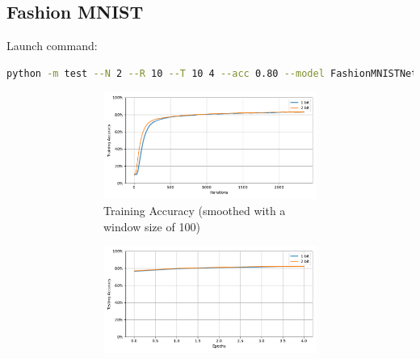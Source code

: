     \subsection{Fashion MNIST}
    \label{appendix:energy_tradeoff_fashion_mnist}
        Launch command: 
        \begin{lstlisting}[language=Bash, basicstyle=\small, breaklines=true]
python -m test --N 2 --R 10 --T 10 4 --acc 0.80 --model FashionMNISTNet --data-path /scratch/zyi/codeSpace/data --dataset FashionMNIST --batch-size 128 --opt adam --lr 2e-3 --lr-scheduler none --epochs 5 --lr-warmup-epochs 0 --output-dir /scratch/zyi/codeSpace/MultibitSpikes/timesteps --mixup-alpha 0.0 --cutmix-alpha 0.0 --label-smoothing 0.0 --disable-amp
        \end{lstlisting}

        \begin{figure}[H]
            \centering
            \begin{subfigure}[H]{0.89\textwidth}
                \centering
                \begin{subfigure}[H]{\textwidth}
                    \includegraphics[width=\textwidth]{../timesteps/FashionMNIST/plots/fashionmnist_train_acc.pdf}
                    \caption{Training Accuracy (smoothed with a window size of 100)}
                \end{subfigure}
                \hfill
                \begin{subfigure}[H]{\textwidth}
                    \includegraphics[width=\textwidth]{../timesteps/FashionMNIST/plots/fashionmnist_test_acc.pdf}

\end{subfigure}
\end{subfigure}
\end{figure}
